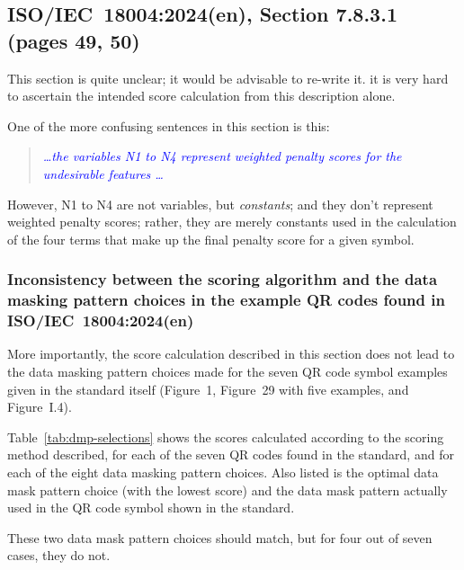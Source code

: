 \documentclass[a4paper,twoside]{article}
\newcommand{\shortstandard}{ISO/IEC~18004}
\newcommand{\standard}{\shortstandard:2024(en)}
\newcommand{\quotestandard}[1]{\textcolor{blue}{\textit{#1}}}
\newcommand{\ddd}{\dots}
\begin{document}
\subsection{\standard, Section 7.8.3.1 (pages 49, 50)}
\label{sec:dmp-scoring}

This section is quite unclear; it would be advisable to re-write it. it is very
hard to ascertain the intended score calculation from this description alone. 

One of the more confusing sentences in this section is this:

\begin{quote}
\quotestandard{\ddd the variables N1 to N4 represent weighted penalty scores for the undesirable features \ddd}
\end{quote}

However, N1 to N4 are not variables, but \emph{constants}; and they don't represent weighted penalty
scores; rather, they are merely constants used in the calculation of the four terms that make up
the final penalty score for a given symbol.

\subsubsection*{Inconsistency between the scoring algorithm and the data masking pattern choices in the example QR codes found in \standard}

More importantly, the score calculation described in this section does not lead to the data masking
pattern choices made for the seven QR code symbol examples given in the standard itself (Figure~1,
Figure~29 with five examples, and Figure~I.4).

Table~\ref{tab:dmp-selections} shows the scores calculated according to the scoring method described, for each of the seven QR codes
found in the standard, and for each of the eight data masking pattern choices. Also listed is the optimal data mask
pattern choice (with the  lowest score) and the data mask pattern actually used in the QR code symbol shown in the standard.

These two data mask pattern choices should match, but for four out of seven cases, they do not.
\end{document}
